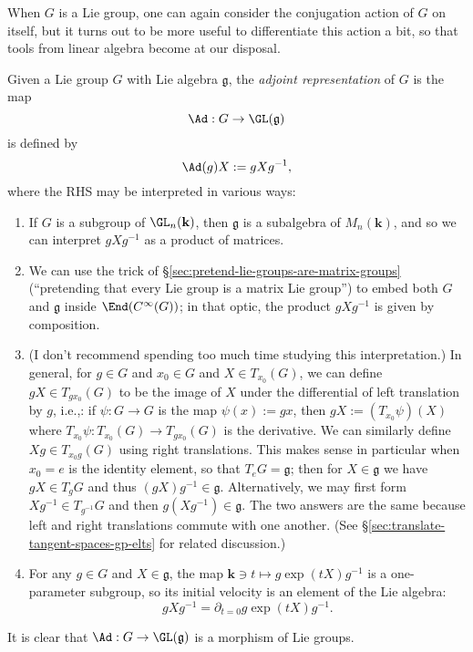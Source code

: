 \documentclass[reqno]{amsart} 
\begin{document}
When $G$ is a Lie group, one can again consider the conjugation
action of $G$ on itself,
but it turns out to be more useful to differentiate this action
a bit, so that tools from linear algebra become at our disposal.
\begin{definition}
  Given a Lie group $G$
  with Lie algebra $\mathfrak{g}$,
  the \emph{adjoint representation} of $G$ is the map
  \begin{equation*}
    \Ad  : G \rightarrow \GL(\mathfrak{g})
  \end{equation*}
  is defined by
  \begin{equation*}
    \Ad(g) X := g X g^{-1},
  \end{equation*}
  where the RHS may be interpreted in various ways:
  \begin{enumerate}
  \item If $G$ is a subgroup of $\GL_n(\mathbf{k})$,
    then $\mathfrak{g}$ is a subalgebra of $M_n(\mathbf{k})$,
    and so we can interpret $g X g^{-1}$ as a product of
    matrices.
  \item
    We can use the trick of
    \S\ref{sec:pretend-lie-groups-are-matrix-groups}
    (``pretending that every Lie group is a matrix Lie group'')
    to embed both $G$ and $\mathfrak{g}$ inside
    $\End(C^\infty(G))$; in that optic,
    the product $g X g^{-1}$ is given by composition.
  \item
    (I don't recommend spending too much time studying
    this interpretation.)
    In general,
    for $g \in G$
    and
    $x_0 \in G$
    and $X \in T_{x_0}(G)$,
    we can define $g X \in T_{g x_0}(G)$ to be the image of $X$ under the
    differential
    of left translation by $g$,
    i.e.,:
    if $\psi : G \rightarrow G$ is the map
    $\psi(x) := g x$,
    then
    $g X := (T_{x_0} \psi)(X)$
    where
    $T_{x_0} \psi : T_{x_0}(G)  \rightarrow T_{g x_0}(G)$ is the
    derivative.
    We can similarly define
    $X g \in T_{x_0 g}(G)$ using right translations.
    This makes sense in particular when $x_0 = e$ is the
    identity element, so that $T_{e} G = \mathfrak{g}$;
    then for $X \in \mathfrak{g}$
    we have $g X \in T_g G$ and thus $(g X) g^{-1} \in
    \mathfrak{g}$.
    Alternatively, we may first form
    $X g^{-1} \in T_{g^{-1}} G$ and then $g (X g^{-1}) \in
    \mathfrak{g}$.
    The two answers are the same because left and right
    translations
    commute  with one another.  (See \S\ref{sec:translate-tangent-spaces-gp-elts} for related discussion.)
  \item
    For any $g \in G$ and $X \in \mathfrak{g}$,
    the map
    $\mathbf{k} \ni t \mapsto g \exp(t X) g^{-1}$
    is a one-parameter subgroup,
    so its initial velocity is an element of the Lie
    algebra:
    \begin{equation*}
      g X g^{-1} = \partial_{t=0}
      g \exp(t X) g^{-1}.
    \end{equation*}
  \end{enumerate}
  It is clear that $\Ad : G \rightarrow \GL(\mathfrak{g})$ is a
  morphism of Lie groups.


\end{definition}
\end{document}

